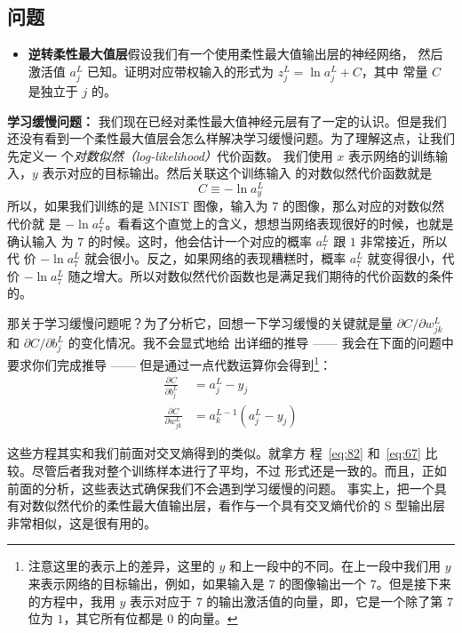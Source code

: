 \subsection*{问题}

\begin{itemize}
\item \textbf{逆转柔性最大值层}\quad 假设我们有一个使用柔性最大值输出层的神经网络，
  然后激活值 $a^L_j$ 已知。证明对应带权输入的形式为 $z^L_j = \ln a^L_j + C$，其中
  常量 $C$ 是独立于 $j$ 的。
\end{itemize}

\textbf{学习缓慢问题：} 我们现在已经对柔性最大值神经元层有了一定的认识。但是我们
还没有看到一个柔性最大值层会怎么样解决学习缓慢问题。为了理解这点，让我们先定义一
个\emph{对数似然（log-likelihood）}代价函数。
我们使用 $x$ 表示网络的训练输入，$y$ 表示对应的目标输出。然后关联这个训练输入
的对数似然代价函数就是
\begin{equation}
  C \equiv -\ln a^L_y
  \label{eq:80}\tag{80}
\end{equation}
所以，如果我们训练的是 MNIST 图像，输入为 $7$ 的图像，那么对应的对数似然代价就
是 $-\ln a_7^L$。看看这个直觉上的含义，想想当网络表现很好的时候，也就是确认输入
为 $7$ 的时候。这时，他会估计一个对应的概率 $a_7^L$ 跟 $1$ 非常接近，所以代
价 $-\ln a_7^L$ 就会很小。反之，如果网络的表现糟糕时，概率 $a_7^L$ 就变得很小，代
价 $-\ln a_7^L$ 随之增大。所以对数似然代价函数也是满足我们期待的代价函数的条件
的。

那关于学习缓慢问题呢？为了分析它，回想一下学习缓慢的关键就是量 $\partial C
/ \partial w^L_{jk}$ 和 $\partial C / \partial b^L_j$ 的变化情况。我不会显式地给
出详细的推导 —— 我会在下面的问题中要求你们完成推导 —— 但是通过一点代数运算你会得到\footnote{
  注意这里的表示上的差异，这里的 $y$ 和上一段中的不同。在上一段中我们用 $y$ 来表示网络的目标输出，例如，如果输入是 7 的图像输出一个 $7$。但是接下来的方程中，我用 $y$ 表示对应于 $7$ 的输出激活值的向量，即，它是一个除了第 7 位为 $1$，其它所有位都是 $0$ 的向量。}：
\begin{align}
  \frac{\partial C}{\partial b^L_j} &= a^L_j-y_j \label{eq:81}\tag{81}\\
  \frac{\partial C}{\partial w^L_{jk}} &= a^{L-1}_k (a^L_j-y_j) \label{eq:82}\tag{82}
\end{align}

这些方程其实和我们前面对交叉熵得到的类似。就拿方
程~\eqref{eq:82} 和~\eqref{eq:67} 比较。尽管后者我对整个训练样本进行了平均，不过
形式还是一致的。而且，正如前面的分析，这些表达式确保我们不会遇到学习缓慢的问题。
事实上，把一个具有对数似然代价的柔性最大值输出层，看作与一个具有交叉熵代价的 S 型输出层非常相似，这是很有用的。


